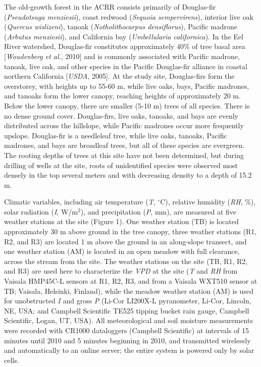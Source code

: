The old-growth forest in the ACRR consists primarily of Douglas-fir (\textit{Pseudotsuga menziesii}), coast redwood (\textit{Sequoia sempervirens}), interior live oak (\textit{Quercus wislizeni}), tanoak (\textit{Notholithocarpus densiflorus}), Pacific madrone (\textit{Arbutus menziesii}), and California bay (\textit{Umbellularia californica}).  In the Eel River watershed, Douglas-fir constitutes approximately 40\% of tree basal area [\textit{Woudenberg et al.}, 2010] and is commonly associated with Pacific madrone, tanoak, live oak, and other species in the Pacific Douglas-fir alliance in coastal northern California [\textit{USDA}, 2005].  At the study site, Douglas-firs form the overstorey, with heights up to 55-60 m, while live oaks, bays, Pacific madrones, and tanoaks form the lower canopy, reaching heights of approximately 20 m.  Below the lower canopy, there are smaller (5-10 m) trees of all species. There is no dense ground cover. Douglas-firs, live oaks, tanoaks, and bays are evenly distributed across the hillslope, while Pacific madrones occur more frequently upslope.  Douglas-fir is a needleleaf tree, while live oaks, tanoaks, Pacific madrones, and bays are broadleaf trees, but all of these species are evergreen. The rooting depths of trees at this site have not been determined, but during drilling of wells at the site, roots of unidentified species were observed most densely in the top several meters and with decreasing density to a depth of 15.2 m.

Climatic variables, including air temperature (\textit{T}, $^{\circ}$C), relative humidity (\textit{RH}, \%), solar radiation (\textit{I}, W/m$^2$), and precipitation (\textit{P}, mm), are measured at five weather stations at the site (Figure 1).  One weather station (TB) is located approximately 30 m above ground in the tree canopy, three weather stations (R1, R2, and R3) are located 1 m above the ground in an along-slope transect, and one weather station (AM) is located in an open meadow with full clearance, across the stream from the site.  The weather stations on the site (TB, R1, R2, and R3) are used here to characterize the \textit{VPD} at the site (\textit{T} and \textit{RH} from Vaisala HMP45C-L sensors at R1, R2, R3, and from a Vaisala WXT510 sensor at TB; Vaisala, Helsinki, Finland), while the meadow weather station (AM) is used for unobstructed \textit{I} and gross \textit{P} (Li-Cor LI200X-L pyranometer, Li-Cor, Lincoln, NE, USA; and Campbell Scientific TE525 tipping bucket rain gauge, Campbell Scientific, Logan, UT, USA).  All meteorological and soil moisture measurements were recorded with CR1000 dataloggers (Campbell Scientific) at intervals of 15 minutes until 2010 and 5 minutes beginning in 2010, and transmitted wirelessly and automatically to an online server; the entire system is powered only by solar cells.

